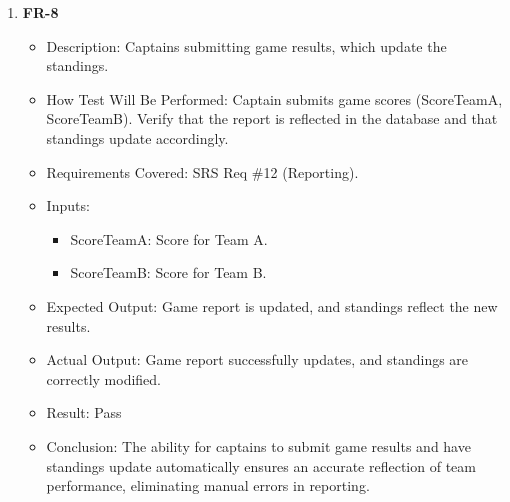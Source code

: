 \documentclass[12pt, titlepage]{article}
\begin{document}
\begin{enumerate}
    \item \textbf{FR-8}  
      \begin{itemize}
          \item Description: Captains submitting game results, which update the standings.
          \item How Test Will Be Performed: Captain submits game scores (ScoreTeamA, ScoreTeamB). Verify that the report is reflected in the database and that standings update accordingly.
          \item Requirements Covered: SRS Req \#12 (Reporting).
          \item Inputs:  
              \begin{itemize} 
                  \item ScoreTeamA: Score for Team A.  
                  \item ScoreTeamB: Score for Team B.  
              \end{itemize}
          \item Expected Output: Game report is updated, and standings reflect the new results.
          \item Actual Output: Game report successfully updates, and standings are correctly modified.
          \item Result: Pass
          \item Conclusion: The ability for captains to submit game results and have standings update automatically ensures an accurate reflection of team performance, eliminating manual errors in reporting.
      \end{itemize}


\end{enumerate}
\end{document}
